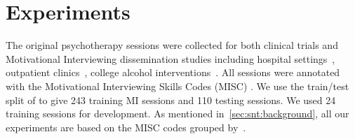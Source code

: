 \section{Experiments}
\label{sec:snt:experiments}

The original psychotherapy sessions were collected for both clinical
trials and Motivational Interviewing dissemination studies including
hospital settings~\citep{roy2014brief}, outpatient
clinics~\citep{baer2009agency}, college alcohol
interventions~\citep{tollison2008questions, neighbors2012randomized,
  lee2013indicated, lee2014randomized}.  All sessions were annotated
with the Motivational Interviewing Skills Codes (MISC)
\cite{atkins2014scaling}.  We use the train/test split of
\citet{can2015dialog, tanana2016comparison} to give 243 training MI
sessions and 110 testing sessions. We used 24 training sessions for
development.
As mentioned in~\autoref{sec:snt:background}, all our experiments are
based on the MISC codes grouped by~\citet{xiao2016behavioral}.





